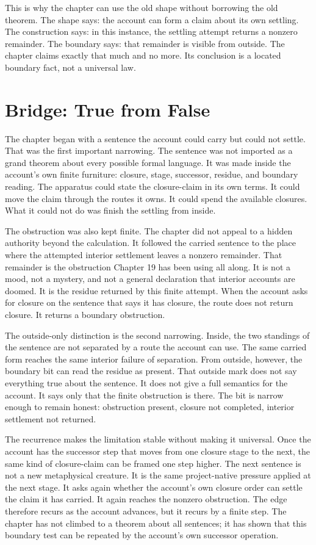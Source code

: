 This is why the chapter can use the old shape without borrowing the old theorem. The shape says:
the account can form a claim about its own settling. The construction says: in this instance,
the settling attempt returns a nonzero remainder. The boundary says: that remainder is visible
from outside. The chapter claims exactly that much and no more. Its conclusion is a located
boundary fact, not a universal law.

\section*{Bridge: True from False}

The chapter began with a sentence the account could carry but could not settle. That was the
first important narrowing. The sentence was not imported as a grand theorem about every
possible formal language. It was made inside the account's own finite furniture: closure,
stage, successor, residue, and boundary reading. The apparatus could state the closure-claim in
its own terms. It could move the claim through the routes it owns. It could spend the available
closures. What it could not do was finish the settling from inside.

The obstruction was also kept finite. The chapter did not appeal to a hidden authority beyond
the calculation. It followed the carried sentence to the place where the attempted interior
settlement leaves a nonzero remainder. That remainder is the obstruction Chapter 19 has been
using all along. It is not a mood, not a mystery, and not a general declaration that interior
accounts are doomed. It is the residue returned by this finite attempt. When the account asks
for closure on the sentence that says it has closure, the route does not return closure. It
returns a boundary obstruction.

The outside-only distinction is the second narrowing. Inside, the two standings of the
sentence are not separated by a route the account can use. The same carried form reaches the
same interior failure of separation. From outside, however, the boundary bit can read the
residue as present. That outside mark does not say everything true about the sentence. It does
not give a full semantics for the account. It says only that the finite obstruction is there.
The bit is narrow enough to remain honest: obstruction present, closure not completed,
interior settlement not returned.

The recurrence makes the limitation stable without making it universal. Once the account has
the successor step that moves from one closure stage to the next, the same kind of
closure-claim can be framed one step higher. The next sentence is not a new metaphysical
creature. It is the same project-native pressure applied at the next stage. It asks again
whether the account's own closure order can settle the claim it has carried. It again reaches
the nonzero obstruction. The edge therefore recurs as the account advances, but it recurs by a
finite step. The chapter has not climbed to a theorem about all sentences; it has shown that
this boundary test can be repeated by the account's own successor operation.

